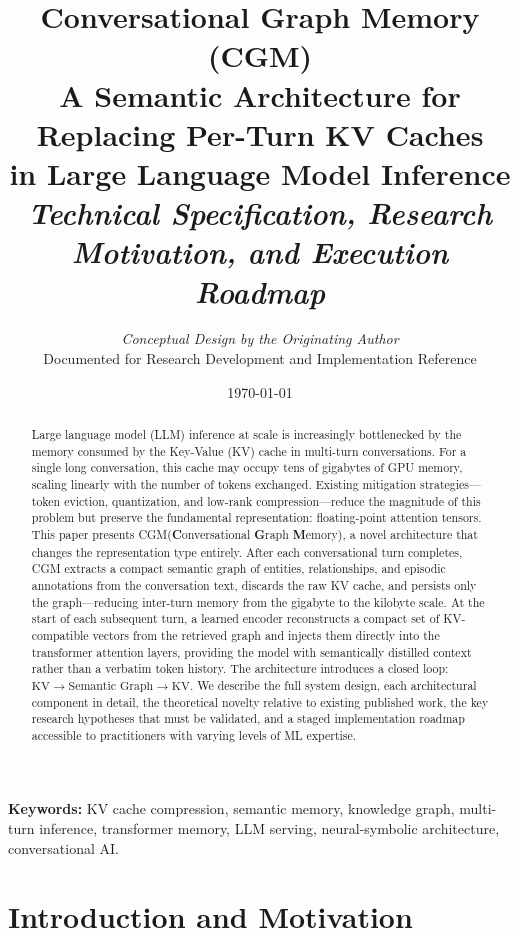 \documentclass[11pt, a4paper, twoside]{article}
\title{
  \Large\textbf{Conversational Graph Memory (CGM)}\\[0.5em]
  \large A Semantic Architecture for Replacing Per-Turn KV Caches\\
  in Large Language Model Inference\\[0.5em]
  \normalsize\textit{Technical Specification, Research Motivation, and Execution Roadmap}
}
\author{
  \textit{Conceptual Design by the Originating Author}\\[0.3em]
  \small Documented for Research Development and Implementation Reference
}
\date{\today}
\theoremstyle{definition}
\newcommand{\CGM}{\textsc{CGM}\xspace}
\begin{document}

\maketitle
\thispagestyle{empty}

\begin{abstract}
\noindent
Large language model (LLM) inference at scale is increasingly bottlenecked by the
memory consumed by the Key-Value (KV) cache in multi-turn conversations. For a single
long conversation, this cache may occupy tens of gigabytes of GPU memory, scaling
linearly with the number of tokens exchanged. Existing mitigation strategies---token
eviction, quantization, and low-rank compression---reduce the magnitude of this problem
but preserve the fundamental representation: floating-point attention tensors. This
paper presents \CGM (\textbf{C}onversational \textbf{G}raph \textbf{M}emory), a novel
architecture that changes the representation type entirely. After each conversational
turn completes, \CGM extracts a compact semantic graph of entities, relationships, and
episodic annotations from the conversation text, discards the raw KV cache, and persists
only the graph---reducing inter-turn memory from the gigabyte to the kilobyte scale.
At the start of each subsequent turn, a learned encoder reconstructs a compact set of
KV-compatible vectors from the retrieved graph and injects them directly into the
transformer attention layers, providing the model with semantically distilled context
rather than a verbatim token history. The architecture introduces a closed loop:
$\text{KV} \rightarrow \text{Semantic Graph} \rightarrow \text{KV}$. We describe the
full system design, each architectural component in detail, the theoretical novelty
relative to existing published work, the key research hypotheses that must be validated,
and a staged implementation roadmap accessible to practitioners with varying levels
of ML expertise.
\end{abstract}

\vspace{1em}
\noindent\textbf{Keywords:} KV cache compression, semantic memory, knowledge graph,
multi-turn inference, transformer memory, LLM serving, neural-symbolic architecture,
conversational AI.

\newpage
\tableofcontents
\newpage

\section{Introduction and Motivation}
\label{sec:intro}
\end{document}
